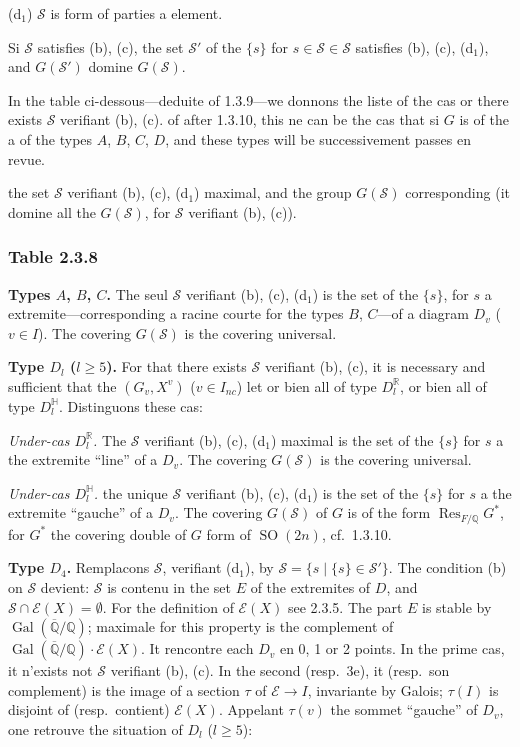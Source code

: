 \documentclass[12pt,a4paper]{article}
\theoremstyle{plain}
\theoremstyle{definition}
\theoremstyle{remark}
\DeclareMathOperator{\Gal}{Gal}
\DeclareMathOperator{\Res}{Res}
\DeclareMathOperator{\SO}{SO}
\newcommand{\QQ}{\mathbb{Q}}
\newcommand{\RR}{\mathbb{R}}
\begin{document}
(d$_1$) $\mathcal{S}$ is form of parties a element.

Si $\mathcal{S}$ satisfies (b), (c), the set $\mathcal{S}'$ of the $\{s\}$ for $s \in \mathcal{S} \in \mathcal{S}$ satisfies (b), (c), (d$_1$), and $G(\mathcal{S}')$ domine $G(\mathcal{S})$.

In the table ci-dessous---deduite of 1.3.9---we donnons the liste of the cas or there exists $\mathcal{S}$ verifiant (b), (c). of after 1.3.10, this ne can be the cas that si $G$ is of the a of the types $A$, $B$, $C$, $D$, and these types will be successivement passes en revue.

the set $\mathcal{S}$ verifiant (b), (c), (d$_1$) maximal, and the group $G(\mathcal{S})$ corresponding (it domine all the $G(\mathcal{S})$, for $\mathcal{S}$ verifiant (b), (c)).

\subsubsection*{Table 2.3.8}

\textbf{Types $A$, $B$, $C$.} The seul $\mathcal{S}$ verifiant (b), (c), (d$_1$) is the set of the $\{s\}$, for $s$ a extremite---corresponding a racine courte for the types $B$, $C$---of a diagram $D_v$ ($v \in I$). The covering $G(\mathcal{S})$ is the covering universal.

\textbf{Type $D_l$ ($l \ge 5$).} For that there exists $\mathcal{S}$ verifiant (b), (c), it is necessary and sufficient that the $(G_v, X^v)$ ($v \in I_{nc}$) let or bien all of type $D_l^{\RR}$, or bien all of type $D_l^{\mathbb{H}}$. Distinguons these cas:

\textit{Under-cas $D_l^{\RR}$.} The $\mathcal{S}$ verifiant (b), (c), (d$_1$) maximal is the set of the $\{s\}$ for $s$ a the extremite ``line'' of a $D_v$. The covering $G(\mathcal{S})$ is the covering universal.

\textit{Under-cas $D_l^{\mathbb{H}}$.} the unique $\mathcal{S}$ verifiant (b), (c), (d$_1$) is the set of the $\{s\}$ for $s$ a the extremite ``gauche'' of a $D_v$. The covering $G(\mathcal{S})$ of $G$ is of the form $\Res_{F/\QQ} G^*$, for $G^*$ the covering double of $G$ form of $\SO(2n)$, cf.~1.3.10.

\textbf{Type $D_4$.} Remplacons $\mathcal{S}$, verifiant (d$_1$), by $\mathcal{S} = \{s \mid \{s\} \in \mathcal{S}'\}$. The condition (b) on $\mathcal{S}$ devient: $\mathcal{S}$ is contenu in the set $E$ of the extremites of $D$, and $\mathcal{S} \cap \mathcal{E}(X) = \emptyset$. For the definition of $\mathcal{E}(X)$ see 2.3.5. The part $E$ is stable by $\Gal(\overline{\QQ}/\QQ)$; maximale for this property is the complement of $\Gal(\overline{\QQ}/\QQ) \cdot \mathcal{E}(X)$. It rencontre each $D_v$ en 0, 1 or 2 points. In the prime cas, it n'exists not $\mathcal{S}$ verifiant (b), (c). In the second (resp.~3e), it (resp.~son complement) is the image of a section $\tau$ of $\mathcal{E} \to I$, invariante by Galois; $\tau(I)$ is disjoint of (resp.~contient) $\mathcal{E}(X)$. Appelant $\tau(v)$ the sommet ``gauche'' of $D_v$, one retrouve the situation of $D_l$ ($l \ge 5$):
\end{document}
